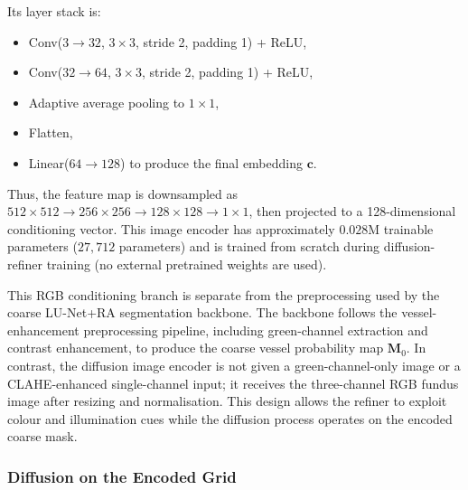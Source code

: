 \documentclass[jimaging,article,submit,pdftex,moreauthors]
  {Definitions/mdpi}
\providecommand{\linelabel}[1]{}
\newcommand{\seclabel}[1]{\linelabel{rev:sec:#1}}
\begin{document}
Its layer stack is:
\begin{itemize}
  \item Conv($3\rightarrow32$, $3\times3$, stride 2, padding 1) + ReLU,
  \item Conv($32\rightarrow64$, $3\times3$, stride 2, padding 1) + ReLU,
  \item Adaptive average pooling to $1\times1$,
  \item Flatten,
  \item Linear($64\rightarrow128$) to produce the final embedding $\mathbf{c}$.
\end{itemize}

Thus, the feature map is downsampled as $512\times512\rightarrow256\times256\rightarrow128\times128\rightarrow1\times1$, then projected to a 128-dimensional conditioning vector. This image encoder has approximately $0.028$M trainable parameters ($27{,}712$ parameters) and is trained from scratch during diffusion-refiner training (no external pretrained weights are used).

This RGB conditioning branch is separate from the preprocessing used by the coarse LU-Net+RA segmentation backbone. The backbone follows the vessel-enhancement preprocessing pipeline, including green-channel extraction and contrast enhancement, to produce the coarse vessel probability map $\mathbf{M}_0$. In contrast, the diffusion image encoder is not given a green-channel-only image or a CLAHE-enhanced single-channel input; it receives the three-channel RGB fundus image after resizing and normalisation. This design allows the refiner to exploit colour and illumination cues while the diffusion process operates on the encoded coarse mask.
\subsubsection{Diffusion on the Encoded Grid}
\label{sec:diffusion_process}
\seclabel{diffusion_process}
\end{document}
